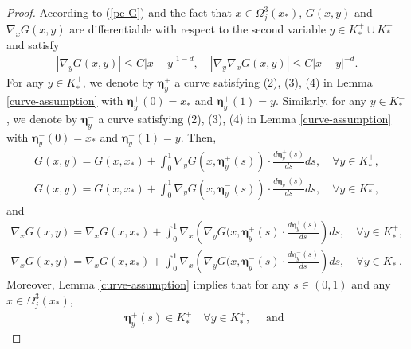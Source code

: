 \documentclass[1996/10/24]{amsart}
\theoremstyle{definition}
\numberwithin{equation}{section}
\begin{document}
\begin{proof}
According to (\ref{pe-G}) and the fact that $x \in \Omega_{j}^{3}(x_{\ast})$, $G(x,y)$ and $\nabla_xG(x,y)$
are differentiable with respect to the second variable $y\in K_{\ast}^{+} \cup K_{\ast}^{-}$ and satisfy
\begin{align}
\left|\nabla_yG(x,y)\right|\leq C|x-y|^{1-d},\quad \left|\nabla_y\nabla_xG(x,y)\right|\leq C|x-y|^{-d}.\label{Taylor_expansions_ad1}
\end{align}
For any $y \in K_{\ast}^{+}$, we denote by $\boldsymbol{\eta}_{y}^{+}$ a curve satisfying (2), (3), (4) in Lemma \ref{curve-assumption}
with $\boldsymbol{\eta}_{y}^{+}(0) = x_{\ast}$ and $\boldsymbol{\eta}_{y}^{+}(1) = y$. Similarly,
for any $y \in K_{\ast}^{-}$, we denote by $\boldsymbol{\eta}_{y}^{-}$ a curve satisfying (2), (3), (4) in Lemma \ref{curve-assumption}
with $\boldsymbol{\eta}_{y}^{-}(0) = x_{\ast}$ and $\boldsymbol{\eta}_{y}^{-}(1) = y$.
Then,
\begin{subequations}
\label{Taylor_expansions1}
\begin{align}
G(x,y)=G(x,x_{\ast})+ \int_{0}^{1} \nabla_y G(x,\boldsymbol{\eta}_{y}^{+}(s))
\cdot\frac{d \boldsymbol{\eta}_{y}^{+}(s)}{ds}ds,
\quad \forall y\in K_{\ast}^+,\\
G(x,y)=G(x,x_{\ast})+\int_{0}^{1} \nabla_y G(x,\boldsymbol{\eta}_{y}^{-}(s))
\cdot\frac{d \boldsymbol{\eta}_{y}^{-}(s)}{ds}ds,
\quad \forall y\in K_{\ast}^{-},
\end{align}
\end{subequations}
and
\begin{subequations}
\label{Taylor_expansions2}
\begin{align}
\nabla_xG(x,y)=\nabla_xG(x,x_{\ast})+\int_{0}^{1}\nabla_x\left(\nabla_y G(x,\boldsymbol{\eta}_{y}^{+}(s)
\cdot \frac{d \boldsymbol{\eta}_{y}^{+}(s)}{ds} \right) ds,
\quad \forall y\in K_{\ast}^+,\\
\nabla_xG(x,y)=\nabla_xG(x,x_{\ast})+\int_{0}^{1}\nabla_x\left(\nabla_y G(x,\boldsymbol{\eta}_{y}^{-}(s)
\cdot \frac{d \boldsymbol{\eta}_{y}^{-} (s)}{ds} \right) ds,
\quad \forall y\in K_{\ast}^{-}.
\end{align}
\end{subequations}
Moreover, Lemma \ref{curve-assumption} implies that for any $s \in (0,1)$ and any $x \in \Omega_{j}^{3}(x_{\ast})$,
\begin{subequations}
\label{Taylor_points_props}
\begin{align}
\label{Taylor_points_prop1}
& \boldsymbol{\eta}_{y}^{+}(s) \in K_{\ast}^{+} \quad \forall y\in K_{\ast}^{+},\quad \text{ and }\quad

\end{align}
\end{subequations}
\end{proof}
\end{document}
